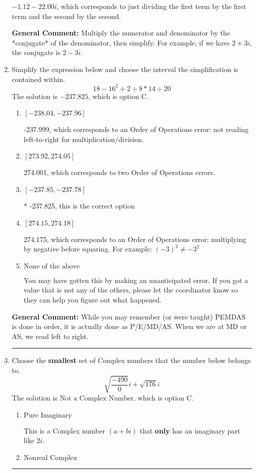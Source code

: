 \documentclass{extbook}[14pt]
\newcommand{\litem}[1]{\item #1

\rule{\textwidth}{0.4pt}}
\begin{document}
\begin{enumerate}
{\begin{enumerate}[label=\Alph*.]
 $-1.12  - 22.00 i$, which corresponds to just dividing the first term by the first term and the second by the second.
\end{enumerate}

\textbf{General Comment:} Multiply the numerator and denominator by the *conjugate* of the denominator, then simplify. For example, if we have $2+3i$, the conjugate is $2-3i$.
}
\litem{
Simplify the expression below and choose the interval the simplification is contained within.
\[ 18 - 16^2 + 2 \div 8 * 14 \div 20 \]The solution is \( -237.825 \), which is option C.\begin{enumerate}[label=\Alph*.]
\item \( [-238.04, -237.96] \)

 -237.999, which corresponds to an Order of Operations error: not reading left-to-right for multiplication/division.
\item \( [273.92, 274.05] \)

 274.001, which corresponds to two Order of Operations errors.
\item \( [-237.85, -237.78] \)

* -237.825, this is the correct option
\item \( [274.15, 274.18] \)

 274.175, which corresponds to an Order of Operations error: multiplying by negative before squaring. For example: $(-3)^2 \neq -3^2$
\item \( \text{None of the above} \)

 You may have gotten this by making an unanticipated error. If you got a value that is not any of the others, please let the coordinator know so they can help you figure out what happened.
\end{enumerate}

\textbf{General Comment:} While you may remember (or were taught) PEMDAS is done in order, it is actually done as P/E/MD/AS. When we are at MD or AS, we read left to right.
}
\litem{
Choose the \textbf{smallest} set of Complex numbers that the number below belongs to.
\[ \sqrt{\frac{-490}{0}} i+\sqrt{176}i \]The solution is \( \text{Not a Complex Number} \), which is option C.\begin{enumerate}[label=\Alph*.]
\item \( \text{Pure Imaginary} \)

This is a Complex number $(a+bi)$ that \textbf{only} has an imaginary part like $2i$.
\item \( \text{Nonreal Complex} \)


\end{enumerate}}
\end{enumerate}
\end{document}
